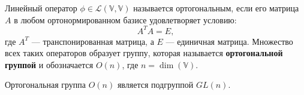 \begin{shdef}
    \begin{definition}
    Линейный оператор \( \phi \in \mathcal{L}(\mathbb{V}, \mathbb{V}) \) называется ортогональным, если его матрица \( A \) в любом ортонормированном базисе удовлетворяет условию:
    \[
    A^T A = E,
    \]
    где \( A^T \) — транспонированная матрица, а \( E \) — единичная матрица. Множество всех таких операторов образует группу, которая называется \textbf{ортогональной группой} и обозначается \( O(n) \), где \( n = \dim(\mathbb{V}) \).
    \end{definition}
\end{shdef}

\begin{shth}
    \begin{theorem}
        Ортогональная группа \( O(n) \) является подгруппой \( GL(n) \).
    \end{theorem}
\end{shth}

